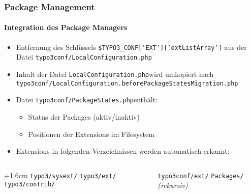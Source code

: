 
\begin{frame}[fragile]
	\frametitle{Package Management}
	\framesubtitle{Integration des Package Managers}

	\begin{itemize}
		\item Entfernung des Schlüssels \small\texttt{\$TYPO3\_CONF['EXT']['extListArray']}\normalsize\space
			aus der Datei \small\texttt{typo3conf/LocalConfiguration.php}\normalsize

		\item Inhalt der Datei \small\texttt{LocalConfiguration.php}\normalsize\space wird umkopiert nach
			\smaller\texttt{typo3conf/LocalConfiguration.beforePackageStatesMigration.php}\normalsize

		\item Datei \small\texttt{typo3conf/PackageStates.php}\normalsize\space enthält:

			\begin{itemize}
				\item Status der Packages (aktiv/inaktiv)
				\item Positionen der Extensions im Filesystem
			\end{itemize}

		\item Extensions in folgenden Verzeichnissen werden automatisch erkannt:
	\end{itemize}

	\begin{columns}[T]
		\begin{column}{.5\textwidth}
			\advance\leftskip+1.6cm
			\small
				\texttt{typo3/sysext/}\newline
				\texttt{typo3/ext/}\newline
				\texttt{typo3/contrib/}\newline
			\normalsize
		\end{column}
		\begin{column}{.5\textwidth}
			\small
				\texttt{typo3conf/ext/}\newline
				\texttt{Packages/} \emph{(rekursiv)}\newline
			\normalsize
		\end{column}
	\end{columns}

\end{frame}

